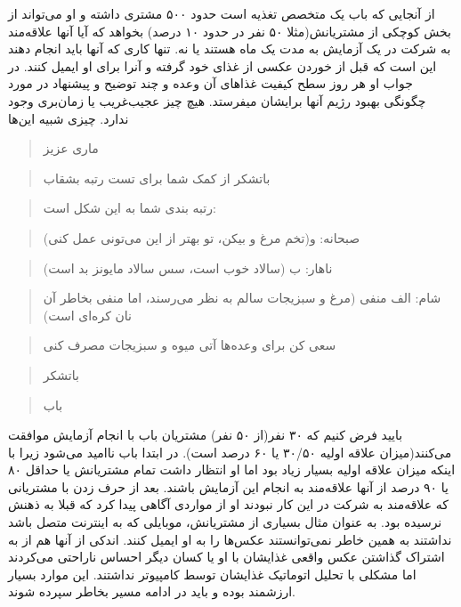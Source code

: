 از آنجایی که باب یک متخصص تغذیه است حدود ۵۰۰ مشتری داشته و او می‌تواند
از بخش کوچکی از مشتریانش(مثلا ۵۰ نفر در حدود ۱۰ درصد) بخواهد که آیا آنها
علاقه‌مند به شرکت در یک آزمایش به مدت یک ماه هستند یا نه. تنها کاری که
آنها باید انجام دهند این است که قبل از خوردن عکسی از غذای خود گرفته و
آنرا برای او ایمیل کنند. در جواب او هر روز سطح کیفیت غذاهای آن وعده و
چند توضیح و پیشنهاد در مورد چگونگی بهبود رژیم آنها برایشان میفرستد. هیچ
چیز عجیب‌غریب یا زمان‌بری وجود ندارد. چیزی شبیه این‌ها

\begin{quote}
ماری عزیز
\end{quote}

\begin{quote}
باتشکر از کمک شما برای تست رتبه بشقاب
\end{quote}

\begin{quote}
رتبه بندی شما به این شکل است:
\end{quote}

\begin{quote}
صبحانه: و(تخم مرغ و بیکن، تو بهتر از این می‌تونی عمل کنی)
\end{quote}

\begin{quote}
ناهار: ب (سالاد خوب است، سس سالاد مایونز بد است)
\end{quote}

\begin{quote}
شام: الف منفی (مرغ و سبزیجات سالم به نظر می‌رسند، اما منفی بخاطر آن نان
کره‌ای است)
\end{quote}

\begin{quote}
سعی کن برای وعده‌ها آتی میوه و سبزیجات مصرف کنی
\end{quote}

\begin{quote}
باتشکر
\end{quote}

\begin{quote}
باب
\end{quote}

بایید فرض کنیم که ۳۰ نفر(از ۵۰ نفر) مشتریان باب با انجام آزمایش موافقت
می‌کنند(میزان علاقه اولیه ۳۰/۵۰ یا ۶۰ درصد است). در ابتدا باب ناامید
می‌شود زیرا با اینکه میزان علاقه اولیه بسیار زیاد بود اما او انتظار داشت
تمام مشتریانش یا حداقل ۸۰ یا ۹۰ درصد از آنها علاقه‌مند به انجام این
آزمایش باشند. بعد از حرف زدن با مشتریانی که علاقه‌مند به شرکت در این کار
نبودند او از مواردی آگاهی پیدا کرد که قبلا به ذهنش نرسیده بود. به عنوان
مثال بسیاری از مشتریانش، موبایلی که به اینترنت متصل باشد نداشتند به همین
خاطر نمی‌توانستند عکس‌ها را به او ایمیل کنند. اندکی از آنها هم از به
اشتراک گذاشتن عکس واقعی غذایشان با او یا کسان دیگر احساس ناراحتی
می‌کردند اما مشکلی با تحلیل اتوماتیک غذایشان توسط کامپیوتر نداشتند. این
موارد بسیار ارزشمند بوده و باید در ادامه مسیر بخاطر سپرده شوند.

